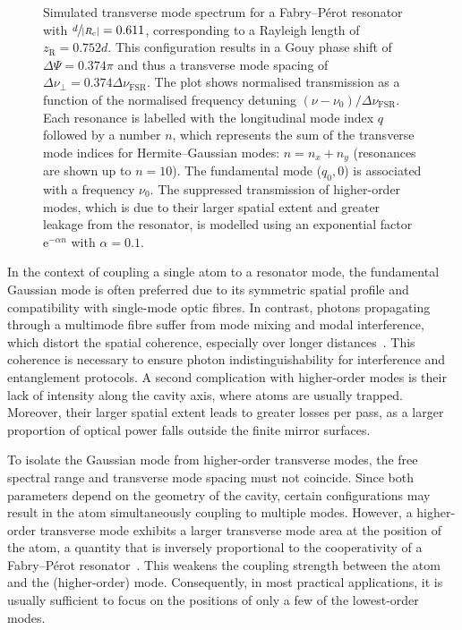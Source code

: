 \documentclass[../Thesis-IJspeert.tex]{subfiles}
\begin{document}
\begin{figure}[t!]
\begin{tikzpicture}[scale=1]
\end{tikzpicture}
\caption[Simulated transverse mode spectrum for a Fabry--Pérot resonator]{
Simulated transverse mode spectrum for a Fabry--Pérot resonator with  \(\sfrac{d}{\lvert R_\mathrm{c} \rvert} = 0.611\), corresponding to a Rayleigh length of \(z_\mathrm{R} = 0.752 d\). This configuration results in a Gouy phase shift of \(\Delta \Psi = 0.374\pi\) and thus a transverse mode spacing of $\Delta\nu_\perp=0.374\Delta\nu_\mathrm{FSR}$. The plot shows normalised transmission as a function of the normalised frequency detuning \((\nu - \nu_0)/\Delta \nu_\mathrm{FSR}\). Each resonance is labelled with the longitudinal mode index \(q\) followed by a number $n$, which represents the sum of the transverse mode indices for Hermite--Gaussian modes: \(n = n_x + n_y\) (resonances are shown up to $n=10$). The fundamental mode (\(q_0, 0\)) is associated with a frequency $\nu_0$. The suppressed transmission of higher-order modes, which is due to their larger spatial extent and greater leakage from the resonator, is modelled using an exponential factor $\mathrm{e}^{-\alpha n}$ with $\alpha=0.1$.
}
\label{transversemodespacing}
\end{figure}

In the context of coupling a single atom to a resonator mode, the fundamental Gaussian mode is often preferred due to its symmetric spatial profile and compatibility with single-mode optic fibres. In contrast, photons propagating through a multimode fibre suffer from mode mixing and modal interference, which distort the spatial coherence, especially over longer distances~\cite{Shekel2023}. This coherence is necessary to ensure photon indistinguishability for interference and entanglement protocols. A second complication with higher-order modes is their lack of intensity along the cavity axis, where atoms are usually trapped. Moreover, their larger spatial extent leads to greater losses per pass, as a larger proportion of optical power falls outside the finite mirror surfaces.

To isolate the Gaussian mode from higher-order transverse modes, the free spectral range and transverse mode spacing must not coincide. Since both parameters depend on the geometry of the cavity, certain configurations may result in the atom simultaneously coupling to multiple modes. However, a higher-order transverse mode exhibits a larger transverse mode area at the position of the atom, a quantity that is inversely proportional to the cooperativity of a Fabry--Pérot resonator~\cite{TanjiSuzuki2011}. This weakens the coupling strength between the atom and the (higher-order) mode. Consequently, in most practical applications, it is usually sufficient to focus on the positions of only a few of the lowest-order modes.
\end{document}
